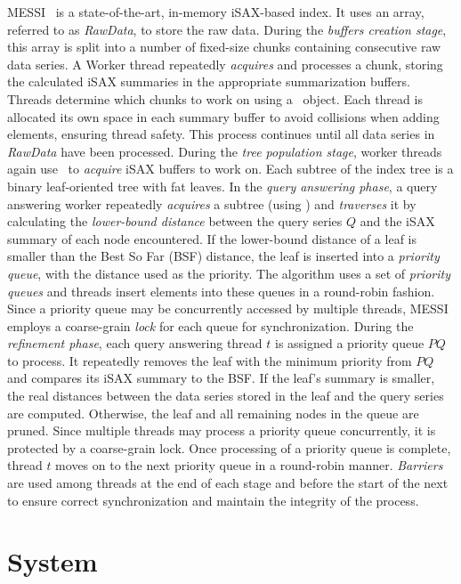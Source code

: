 MESSI~\cite{peng2020messi} is a state-of-the-art, in-memory iSAX-based index.
It uses an array, referred to as \textit{RawData}, to store the raw data. During the 
{\em buffers creation stage}, this array is split into a number of fixed-size chunks 
containing consecutive raw data series. A Worker thread repeatedly {\em acquires} and
processes a chunk, storing the calculated iSAX summaries in the appropriate 
summarization buffers. Threads determine which chunks to work on using a \FAI\ object.
Each thread is allocated its own space in each summary buffer to avoid collisions when
adding elements, ensuring thread safety. This process continues until all data series in
\textit{RawData} have been processed.
% 
During the {\em tree population stage}, worker threads again use \FAI\ to {\em acquire}
iSAX buffers to work on. Each subtree of the index tree is a binary leaf-oriented tree
with fat leaves.
% 
In the {\em query answering phase}, a query answering worker repeatedly {\em acquires}
a subtree (using \FAI) and {\em traverses} it by calculating the {\em lower-bound
distance} between the query series \( Q \) and the iSAX summary of each node
encountered. If the lower-bound distance of a leaf is smaller than the Best So Far (BSF)
distance, the leaf is inserted into a {\em priority queue}, with the distance
used as the priority. The algorithm uses a set of {\em priority queues} and threads 
insert elements into these queues in a round-robin fashion.
Since a priority queue may be concurrently accessed by multiple threads, 
MESSI employs a coarse-grain {\em lock} for each queue for synchronization.
% 
During the {\em refinement phase}, each query answering thread \( t \) is assigned a 
priority queue \( \mathit{PQ} \) to process. It repeatedly removes the leaf with the
minimum priority from \( \mathit{PQ} \) and compares its iSAX summary to the BSF.
If the leaf's summary is smaller, the real distances between the data series stored
in the leaf and the query series are computed. Otherwise, the leaf and all remaining
nodes in the queue are pruned. Since multiple threads may process a priority queue
concurrently, it is protected by a coarse-grain lock. Once processing of a priority
queue is complete, thread \( t \) moves on to the next priority queue in a round-robin
manner.
% 
{\em Barriers} are used among threads at the end of each stage and before the start of 
the next to ensure correct synchronization and maintain the integrity of the process.

\section{System}

